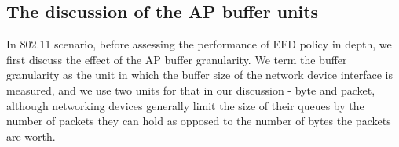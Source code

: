 \documentclass[preprint,12pt]{elsarticle}
\begin{document}
%




\subsection{The discussion of the AP buffer units} \label{sec:buffer_granularity}
In 802.11 scenario, before assessing the performance of EFD policy in depth, we first discuss the effect of the AP buffer granularity. We term the buffer granularity as the unit in which the buffer size of the network device interface is measured, and we use two units for that in our discussion - byte and packet, although networking devices generally limit the size of their queues by the number of packets they can hold as opposed to the number of bytes the packets are worth.%
\end{document}
